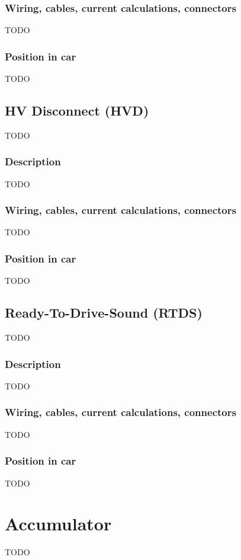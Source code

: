 \documentclass{article}
\begin{document}
\subsubsection{Wiring, cables, current calculations, connectors}
TODO

\subsubsection{Position in car}
TODO

\subsection{HV Disconnect (HVD)}
TODO

\subsubsection{Description}
TODO

\subsubsection{Wiring, cables, current calculations, connectors}
TODO

\subsubsection{Position in car}
TODO

\subsection{Ready-To-Drive-Sound (RTDS)}
TODO

\subsubsection{Description}
TODO

\subsubsection{Wiring, cables, current calculations, connectors}
TODO

\subsubsection{Position in car}
TODO

\section{Accumulator}
TODO
\end{document}
